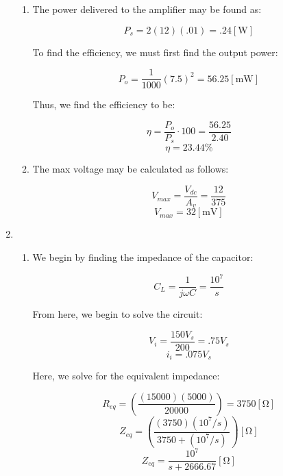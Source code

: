 \begin{enumerate}
\begin{enumerate}
      \item 

        \begin{center}
          The power delivered to the amplifier may be found as:
        \end{center}
        $$\boxed{P_s=2(12)(.01)=.24[\si{\watt}]}$$

        \begin{center}
          To find the efficiency, we must first find the output power:
        \end{center}
        $$P_o=\frac{1}{1000}(7.5)^2=56.25[\si{\milli\watt}]$$

        \begin{center}
          Thus, we find the efficiency to be:
        \end{center}
        $$\eta=\frac{P_o}{P_s}\cdot100=\frac{56.25}{2.40}$$
        $$\boxed{\eta=23.44\%}$$

      \item 

        \begin{center}
          The max voltage may be calculated as follows:
        \end{center}
        $$V_{max}=\frac{V_{dc}}{A_v}=\frac{12}{375}$$
        $$\boxed{V_{max}=32[\si{\milli\volt}]}$$

    \end{enumerate}

  \item

    \begin{enumerate}

      \item We begin by finding the impedance of the capacitor:

        $$C_L=\frac{1}{j\omega C}=\frac{10^7}{s}$$

        \begin{center}
          From here, we begin to solve the circuit:
        \end{center}
        $$V_i=\frac{150V_s}{200}=.75V_s$$
        $$i_{i}=.075V_s$$

        \begin{center}
          Here, we solve for the equivalent impedance:
        \end{center}
        $$R_{eq}=\left( \frac{(15000)(5000)}{20000} \right)=3750[\si{\ohm}]$$
        $$Z_{eq}=\left( \frac{(3750)(10^7/s)}{3750+(10^7/s)} \right)[\si{\ohm}]$$
        $$Z_{eq}=\frac{10^7}{s+2666.67}[\si{\ohm}]$$


\end{enumerate}
\end{enumerate}

